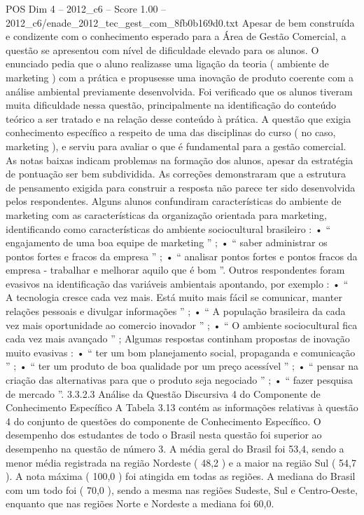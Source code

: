 \begin{textsample}{POS Dim 4 – 2012\_c6 – Score 1.00 – 2012\_c6/enade\_2012\_tec\_gest\_com\_8fb0b169d0.txt}
Apesar de bem construída e condizente com o conhecimento esperado para a Área de Gestão Comercial, a questão se apresentou com nível de dificuldade elevado para os alunos.
O enunciado pedia que o aluno realizasse uma ligação da teoria ( ambiente de marketing ) com a prática e propusesse uma inovação de produto coerente com a análise ambiental previamente desenvolvida.
Foi verificado que os alunos tiveram muita dificuldade nessa questão, principalmente na identificação do conteúdo teórico a ser tratado e na relação desse conteúdo à prática.
A questão que exigia conhecimento específico a respeito de uma das disciplinas do curso ( no caso, marketing ), e serviu para avaliar o que é fundamental para a gestão comercial.
As notas baixas indicam problemas na formação dos alunos, apesar da estratégia de pontuação ser bem subdividida.
As correções demonstraram que a estrutura de pensamento exigida para construir a resposta não parece ter sido desenvolvida pelos respondentes.
Alguns alunos confundiram características do ambiente de marketing com as características da organização orientada para marketing, identificando como características do ambiente sociocultural brasileiro : • “ engajamento de uma boa equipe de marketing ” ; • “ saber administrar os pontos fortes e fracos da empresa ” ; • “ analisar pontos fortes e pontos fracos da empresa - trabalhar e melhorar aquilo que é bom ”.
Outros respondentes foram evasivos na identificação das variáveis ambientais apontando, por exemplo : • “ A tecnologia cresce cada vez mais.
Está muito mais fácil se comunicar, manter relações pessoais e divulgar informações ” ; • “ A população brasileira da cada vez mais oportunidade ao comercio inovador ” ; • “ O ambiente sociocultural fica cada vez mais avançado ” ; Algumas respostas continham propostas de inovação muito evasivas : • “ ter um bom planejamento social, propaganda e comunicação ” ; • “ ter um produto de boa qualidade por um preço acessível ” ; • “ pensar na criação das alternativas para que o produto seja negociado ” ; • “ fazer pesquisa de mercado ”. 3.3.2.3 Análise da Questão Discursiva 4 do Componente de Conhecimento Específico A Tabela 3.13 contém as informações relativas à questão 4 do conjunto de questões do componente de Conhecimento Específico.
O desempenho dos estudantes de todo o Brasil nesta questão foi superior ao desempenho na questão de número 3.
A média geral do Brasil foi 53,4, sendo a menor média registrada na região Nordeste ( 48,2 ) e a maior na região Sul ( 54,7 ).
A nota máxima ( 100,0 ) foi atingida em todas as regiões.
A mediana do Brasil com um todo foi ( 70,0 ), sendo a mesma nas regiões Sudeste, Sul e Centro-Oeste, enquanto que nas regiões Norte e Nordeste a mediana foi 60,0.

\end{textsample}
